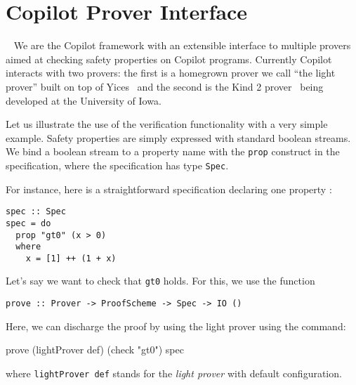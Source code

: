 \section{Copilot Prover Interface}~\label{sec:prover} 
We are the Copilot framework with an extensible interface to multiple
provers aimed at checking  safety properties on Copilot
programs. Currently Copilot interacts with two provers: the first is a
homegrown prover we call ``the light prover'' built on top of
Yices~\cite{Dutertre:cav2014} and the second is the Kind 2 prover~\cite{ZZZ} being developed at
the University of Iowa.  

Let us illustrate the use of the verification functionality with a
very simple example.  Safety properties are simply expressed with
standard boolean streams.  We bind a boolean stream to a property name
with the \texttt{prop} construct in the specification, where the
specification has type \texttt{Spec}.

For instance, here is a straightforward specification declaring one
property :

\begin{lstlisting}[frame=single]
spec :: Spec
spec = do
  prop "gt0" (x > 0)
  where
    x = [1] ++ (1 + x)
\end{lstlisting}

Let's say we want to check that \texttt{gt0} holds. For this, we use
the function

\begin{lstlisting}[frame=single]
    prove :: Prover -> ProofScheme -> Spec -> IO ()
\end{lstlisting}

Here, we can discharge the proof by  using the light prover using the command:
\begin{code}
prove (lightProver def) (check "gt0") spec
\end{code}
where \texttt{lightProver def} stands for the \emph{light prover} with
default configuration.  

